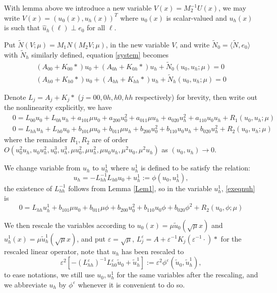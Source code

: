 \documentclass[letterpaper,11pt]{article}
\newcommand{\eps}{\varepsilon}
\numberwithin{equation}{section}
\theoremstyle{plain}
\begin{document}
With lemma above we introduce a new variable $V(x) = M_2^{-1}U(x)$, we may write $V(x) = (u_0(x), u_h(x))^T$ where $u_0(x)$ is scalar-valued and $u_h(x)$ is such that $\hat{u}_h(\ell) \perp e_0$ for all $\ell$.


Put $\tilde{N}(V;\mu) = M_1N(M_2V ; \mu)$, in the new variable $V$, and write $\tilde{N}_0 = \langle \tilde{N}, e_0\rangle$ with $\tilde{N}_h$ similarly defined, equation \eqref{system} becomes
\begin{align}
(A_{00}+K_{00} \ast) u_0 + (A_{0h}+K_{0h}\ast)u_h + \tilde{N}_0(u_0,u_h;\mu) = 0\label{eqnu0}\\
(A_{h0}+K_{h0} \ast) u_0 + (A_{hh}+K_{hh}\ast)u_h + \tilde{N}_h(u_0,u_h;\mu) = 0 \label{eqnuh}
\end{align}

Denote $L_{j} = A_{j}+K_{j}\ast$ ($j=00,0h,h0,hh$ respectively) for brevity, then write out the nonlinearity explicitly, we have
\begin{align}
&0=L_{00}u_0+L_{0h}u_h + a_{101}\mu u_0 +a_{200}u_0^2+a_{011}\mu u_h+a_{020}u_h^2+a_{110}u_0u_h + R_1(u_0,u_h;\mu)\label{exeqnu0} \\ 
&0=L_{hh} u_h+L_{h0}u_0+ b_{101}\mu u_0+b_{011}\mu u_h +b_{200}u_0^2+b_{110}u_0u_h+b_{020}u_h^2+R_2(u_0,u_h;\mu) \label{exeqnuh}
\end{align}
where the remainder $R_1,R_2$ are of order $O(u_0^2u_h,u_0u_h^2,u_0^3,u_h^3,\mu u_0^2, \mu u_h^2,\mu u_0u_h, \mu^2u_0, \mu^2u_h)$ as $(u_0,u_h) \to 0$.

We change variable from $u_h$ to $u_h^1$ where $u_h^1$ is defined to be satisfy the relation: 
\[
u_h = -L_{hh}^{-1} L_{h0} u_0 + u_h^1:= \phi(u_0, u_h^1),
\]
 the existence of $L_{hh}^{-1}$ follows from Lemma \ref{Lem1}, so in the variable $u_h^1$, \eqref{exeqnuh} is 
 \[
 0 = L_{hh}u_h^1 + b_{101}\mu u_0+b_{011}\mu \phi +b_{200}u_0^2+b_{110}u_0\phi+b_{020}\phi^2+R_2(u_0,\phi;\mu)
 \]



We then rescale the variables according to $u_0(x) = \mu \tilde{u}_0(\sqrt{\mu}x)$ and $u_h^1(x) = \mu \tilde{u}_h^1(\sqrt{\mu}x)$, and put $\eps = \sqrt{\mu}$, $L_{j}^{\eps} = A + \eps^{-1}K_{j}(\eps^{-1}\cdot) \ast$ for the rescaled linear operator, note that $u_h$ has been rescaled to \[
\eps^2 [-(L_{hh}^{\eps})^{-1}L_{h0}^{\eps}\tilde{u}_0+\tilde{u}_h^1] := \eps^2 \phi^{\eps}(\tilde{u}_0,\tilde{u}_h^1),
\] 
to ease notations, we still use $u_0,u_h^1$ for the same variables after the rescaling, and we abbreviate $u_h$ by $\phi^\eps$ whenever it is convenient to do so.
\end{document}

